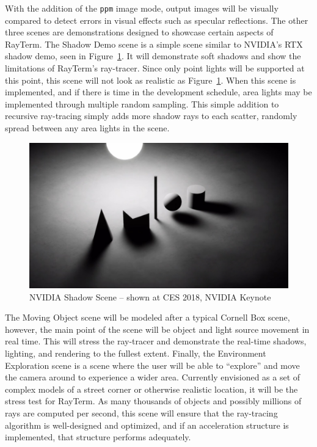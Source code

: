\documentclass[11pt]{article}
\newcommand{\name}{{\sc RayTerm}}
\begin{document}
With the addition of the {\texttt{ppm}} image mode, output images will be visually compared to detect errors in visual effects such as specular reflections.
The other three scenes are demonstrations designed to showcase certain aspects of \name.
The Shadow Demo scene is a simple scene similar to NVIDIA's RTX shadow demo, seen in Figure~\ref{fig:nvidia_shadows}.
It will demonstrate soft shadows and show the limitations of \name's ray-tracer.
Since only point lights will be supported at this point, this scene will not look as realistic as Figure~\ref{fig:nvidia_shadows}.
When this scene is implemented, and if there is time in the development schedule, area lights may be implemented through multiple random sampling.
This simple addition to recursive ray-tracing simply adds more shadow rays to each scatter, randomly spread between any area lights in the scene.

\begin{figure}[htb]
  \centering
  \includegraphics[width=\textwidth]{resources/nvidia_shadows}
  \caption{NVIDIA Shadow Scene -- shown at CES 2018, NVIDIA Keynote}
  \label{fig:nvidia_shadows}
\end{figure}

The Moving Object scene will be modeled after a typical Cornell Box scene, however, the main point of the scene will be object and light source movement in real time.
This will stress the ray-tracer and demonstrate the real-time shadows, lighting, and rendering to the fullest extent.
Finally, the Environment Exploration scene is a scene where the user will be able to ``explore'' and move the camera around to experience a wider area.
Currently envisioned as a set of complex models of a street corner or otherwise realistic location, it will be the stress test for \name.
As many thousands of objects and possibly millions of rays are computed per second, this scene will ensure that the ray-tracing algorithm is well-designed and optimized, and if an acceleration structure is implemented, that structure performs adequately.
\end{document}
